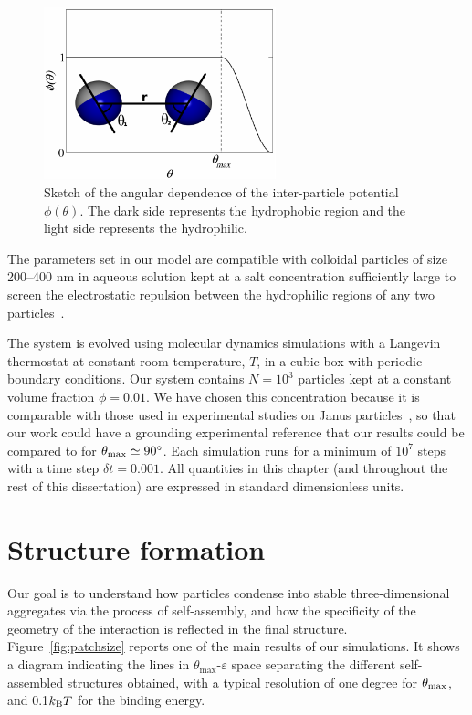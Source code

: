 \begin{figure}
	\begin{center}\includegraphics[width=0.6\textwidth,clip]{janus/phiwithimage}\end{center}
	\caption[Angular dependence of the interparticle potential]{Sketch of the angular dependence of the inter-particle potential $\phi\left(\theta\right)$.  The dark side represents the hydrophobic region and the light side represents the hydrophilic.}\label{fig:phi}
\end{figure}
The parameters set in our model are compatible with colloidal particles of size 200--400 nm in aqueous solution kept at a salt concentration sufficiently large to screen the electrostatic repulsion between the hydrophilic regions of any two particles~\cite{Hong2}.

The system is evolved using molecular dynamics simulations with a Langevin thermostat at constant room temperature, $T$, in a cubic box with periodic boundary conditions.
Our system contains $N=10^3$ particles kept at a constant volume fraction $\phi=0.01$.  
We have chosen this concentration because it is comparable with those used in experimental studies on Janus particles~\cite{Hong2}, so that our work could have a grounding experimental reference that our results could be compared to for $\theta_{\rm max}\simeq 90^{\circ}$.
Each simulation runs for  a minimum of $10^7$ steps with a time step $\delta t=0.001$. 
All quantities in this chapter (and throughout the rest of this dissertation) are expressed in standard dimensionless units.

\section{Structure formation}
Our goal is to understand how particles condense into stable three-dimensional aggregates via the process of self-assembly, and how the specificity of the  geometry of the interaction is reflected in the final structure.
Figure~\ref{fig:patchsize} reports one of the main results of our simulations.  
It shows a diagram indicating the lines in $\theta_{\textrm{max}}$-$\varepsilon$ space separating the different self-assembled structures obtained, with a typical resolution of one degree for $\theta_{\rm max}$, and 0.1$k_{\rm B}T$ for the binding energy. 

